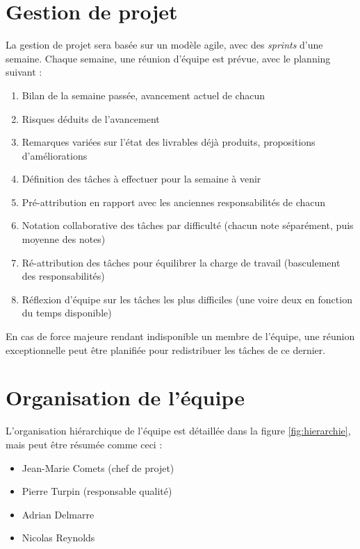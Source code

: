 \section{Gestion de projet}

La gestion de projet sera basée sur un modèle agile, avec des \textit{sprints}
d'une semaine. Chaque semaine, une réunion d'équipe est prévue, avec le
planning suivant :

\begin{enumerate}
    \item Bilan de la semaine passée, avancement actuel de chacun
    \item Risques déduits de l'avancement
    \item Remarques variées sur l'état des livrables déjà produits,
        propositions d'améliorations
    \item Définition des tâches à effectuer pour la semaine à venir
    \item Pré-attribution en rapport avec les anciennes responsabilités de
        chacun
    \item Notation collaborative des tâches par difficulté (chacun note
        séparément, puis moyenne des notes)
    \item Ré-attribution des tâches pour équilibrer la charge de travail
        (basculement des responsabilités)
    \item Réflexion d'équipe sur les tâches les plus difficiles (une voire deux
        en fonction du temps disponible)
\end{enumerate}

En cas de force majeure rendant indisponible un membre de l'équipe, une réunion
exceptionnelle peut être planifiée pour redistribuer les tâches de ce dernier.

\section{Organisation de l'équipe}

L'organisation hiérarchique de l'équipe est détaillée dans la figure
\ref{fig:hierarchie}, mais peut être résumée comme ceci :

\begin{itemize}
    \item Jean-Marie Comets (chef de projet)
    \item Pierre Turpin (responsable qualité)
    \item Adrian Delmarre
    \item Nicolas Reynolds
\end{itemize}

